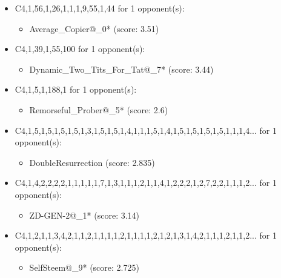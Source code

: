 \begin{appendices}
\begin{itemize}
    \item C4,1,56,1,26,1,1,1,9,55,1,44 for 1 opponent(s):
    \begin{multicols}{3}
         \begin{itemize}
            \item Average\_Copier@\_0* (score: 3.51)
        \end{itemize}
     \end{multicols}
     
    \item C4,1,39,1,55,100 for 1 opponent(s):
    \begin{multicols}{3}
         \begin{itemize}
            \item Dynamic\_Two\_Tits\_For\_Tat@\_7* (score: 3.44)
        \end{itemize}
     \end{multicols}
     
    \item C4,1,5,1,188,1 for 1 opponent(s):
    \begin{multicols}{3}
         \begin{itemize}
            \item Remorseful\_Prober@\_5* (score: 2.6)
        \end{itemize}
     \end{multicols}
     
    \item C4,1,5,1,5,1,5,1,5,1,3,1,5,1,5,1,4,1,1,1,5,1,4,1,5,1,5,1,5,1,5,1,1,1,4... for 1 opponent(s):
    \begin{multicols}{3}
         \begin{itemize}
            \item DoubleResurrection (score: 2.835)
        \end{itemize}
     \end{multicols}
     
    \item C4,1,4,2,2,2,2,1,1,1,1,1,7,1,3,1,1,1,2,1,1,4,1,2,2,2,1,2,7,2,2,1,1,1,2... for 1 opponent(s):
    \begin{multicols}{3}
         \begin{itemize}
            \item ZD-GEN-2@\_1* (score: 3.14)
        \end{itemize}
     \end{multicols}
     
    \item C4,1,2,1,1,3,4,2,1,1,2,1,1,1,1,2,1,1,1,1,2,1,2,1,3,1,4,2,1,1,1,2,1,1,2... for 1 opponent(s):
    \begin{multicols}{3}
         \begin{itemize}
            \item SelfSteem@\_9* (score: 2.725)
        \end{itemize}
     \end{multicols}
     

\end{itemize}
\end{appendices}

